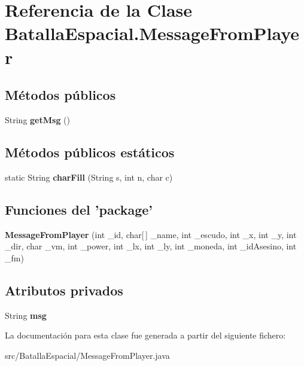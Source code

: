 \hypertarget{classBatallaEspacial_1_1MessageFromPlayer}{
\section{Referencia de la Clase BatallaEspacial.MessageFromPlayer}
\label{classBatallaEspacial_1_1MessageFromPlayer}
}
\subsection*{Métodos públicos}
\begin{DoxyCompactItemize}
\item 
\hypertarget{classBatallaEspacial_1_1MessageFromPlayer_a8e7ff2f90816afb286c77e9fecd7754d}{
String {\bfseries getMsg} ()}
\label{classBatallaEspacial_1_1MessageFromPlayer_a8e7ff2f90816afb286c77e9fecd7754d}

\end{DoxyCompactItemize}
\subsection*{Métodos públicos estáticos}
\begin{DoxyCompactItemize}
\item 
\hypertarget{classBatallaEspacial_1_1MessageFromPlayer_af8e32dfb2d1d3d16ce4759b7c7fb7585}{
static String {\bfseries charFill} (String s, int n, char c)}
\label{classBatallaEspacial_1_1MessageFromPlayer_af8e32dfb2d1d3d16ce4759b7c7fb7585}

\end{DoxyCompactItemize}
\subsection*{Funciones del 'package'}
\begin{DoxyCompactItemize}
\item 
\hypertarget{classBatallaEspacial_1_1MessageFromPlayer_a0726f0c83695518df2d73a7a74c65853}{
{\bfseries MessageFromPlayer} (int \_\-id, char\mbox{[}$\,$\mbox{]} \_\-name, int \_\-escudo, int \_\-x, int \_\-y, int \_\-dir, char \_\-vm, int \_\-power, int \_\-lx, int \_\-ly, int \_\-moneda, int \_\-idAsesino, int \_\-fm)}
\label{classBatallaEspacial_1_1MessageFromPlayer_a0726f0c83695518df2d73a7a74c65853}

\end{DoxyCompactItemize}
\subsection*{Atributos privados}
\begin{DoxyCompactItemize}
\item 
\hypertarget{classBatallaEspacial_1_1MessageFromPlayer_afee8010406a5937e9900d38fc9142970}{
String {\bfseries msg}}
\label{classBatallaEspacial_1_1MessageFromPlayer_afee8010406a5937e9900d38fc9142970}

\end{DoxyCompactItemize}


La documentación para esta clase fue generada a partir del siguiente fichero:\begin{DoxyCompactItemize}
\item 
src/BatallaEspacial/MessageFromPlayer.java\end{DoxyCompactItemize}
